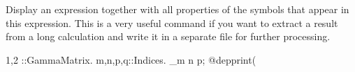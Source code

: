 
Display an expression together with all 
properties of the symbols that appear in this expression. This is a
very useful command if you want to extract a result from a long
calculation and write it in a separate file for further processing. 
\begin{screen}{1,2}
\Gamma{#}::GammaMatrix.
{m,n,p,q}::Indices.
\Gamma_{m n p};
@depprint(%
\end{screen}
~

